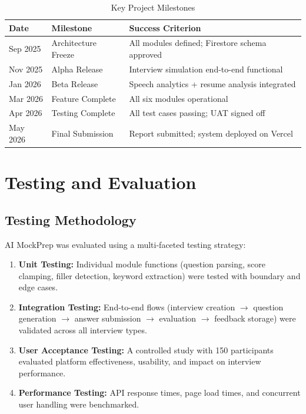 \documentclass[12pt,a4paper,oneside]{report}
\begin{document}
\begin{table}[H]
\centering
\caption{Key Project Milestones}
\label{tab:milestones}
\begin{tabular}{|p{2cm}|p{5cm}|p{5.5cm}|}
\hline
\textbf{Date} & \textbf{Milestone} & \textbf{Success Criterion} \\
\hline
Sep 2025 & Architecture Freeze & All modules defined; Firestore schema approved \\
\hline
Nov 2025 & Alpha Release & Interview simulation end-to-end functional \\
\hline
Jan 2026 & Beta Release & Speech analytics + resume analysis integrated \\
\hline
Mar 2026 & Feature Complete & All six modules operational \\
\hline
Apr 2026 & Testing Complete & All test cases passing; UAT signed off \\
\hline
May 2026 & Final Submission & Report submitted; system deployed on Vercel \\
\hline
\end{tabular}
\end{table}


\chapter{Testing and Evaluation}
\label{ch:testing}

\section{Testing Methodology}

AI MockPrep was evaluated using a multi-faceted testing strategy:

\begin{enumerate}
  \item \textbf{Unit Testing:} Individual module functions (question parsing, score clamping, filler detection, keyword extraction) were tested with boundary and edge cases.
  \item \textbf{Integration Testing:} End-to-end flows (interview creation $\rightarrow$ question generation $\rightarrow$ answer submission $\rightarrow$ evaluation $\rightarrow$ feedback storage) were validated across all interview types.
  \item \textbf{User Acceptance Testing:} A controlled study with 150 participants evaluated platform effectiveness, usability, and impact on interview performance.
  \item \textbf{Performance Testing:} API response times, page load times, and concurrent user handling were benchmarked.
\end{enumerate}
\end{document}
